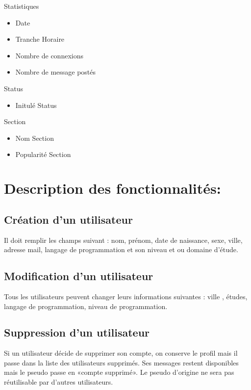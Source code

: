 \documentclass{report}
\begin{document}
	Statistiques
  \begin{itemize}
		\item Date
		\item Tranche Horaire
		\item Nombre de connexions
		\item Nombre de message postés\\
    \end{itemize}
	Status
  \begin{itemize}
		\item Initulé Status\\
    \end{itemize}
	Section
  \begin{itemize}
		\item Nom Section
		\item Popularité Section\\
  \end{itemize}


\section{Description des fonctionnalités:}

\subsection{Création d'un utilisateur}
		Il doit remplir les champs suivant : nom, prénom, date 	de naissance, sexe, ville, adresse mail, langage de programmation et son niveau et ou domaine d’étude.

\subsection{Modification d’un utilisateur}
		Tous les utilisateurs peuvent changer leurs informations 	suivantes : ville , études, langage de programmation, niveau 	de programmation.

\subsection{Suppression d’un utilisateur}
		Si un utilisateur décide de supprimer son compte, on 	conserve le profil mais il passe dans la liste des 	utilisateurs 	supprimés. Ses messages restent disponibles mais le 	pseudo 	passe en «compte supprimé». Le pseudo d'origine ne 	sera pas 	réutilisable par d'autres utilisateurs.
\end{document}
